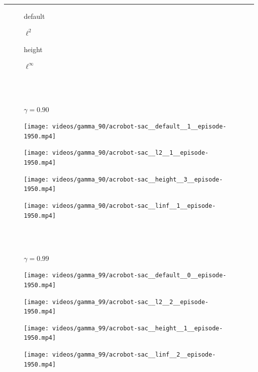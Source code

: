 \documentclass[
  letterpaper,
  DIV=11,
  numbers=noendperiod,
  oneside]{scrartcl}
\begin{document}
\begin{center}\rule{0.5\linewidth}{0.5pt}\end{center}

\begin{figure}

\begin{minipage}{0.20\linewidth}

\end{minipage}%
%
\begin{minipage}{0.20\linewidth}
default\end{minipage}%
%
\begin{minipage}{0.20\linewidth}
\(\ell^2\)\end{minipage}%
%
\begin{minipage}{0.20\linewidth}
height\end{minipage}%
%
\begin{minipage}{0.20\linewidth}
\(\ell^\infty\)\end{minipage}%
\newline
\begin{minipage}{0.20\linewidth}
\\
\strut \\
\(\gamma = 0.90\)\end{minipage}%
%
\begin{minipage}{0.20\linewidth}
\texttt{[image: videos/gamma\_90/acrobot-sac\_\_default\_\_1\_\_episode-1950.mp4]}\end{minipage}%
%
\begin{minipage}{0.20\linewidth}
\texttt{[image: videos/gamma\_90/acrobot-sac\_\_l2\_\_1\_\_episode-1950.mp4]}\end{minipage}%
%
\begin{minipage}{0.20\linewidth}
\texttt{[image: videos/gamma\_90/acrobot-sac\_\_height\_\_3\_\_episode-1950.mp4]}\end{minipage}%
%
\begin{minipage}{0.20\linewidth}
\texttt{[image: videos/gamma\_90/acrobot-sac\_\_linf\_\_1\_\_episode-1950.mp4]}\end{minipage}%
\newline
\begin{minipage}{0.20\linewidth}
\\
\strut \\
\(\gamma = 0.99\)\end{minipage}%
%
\begin{minipage}{0.20\linewidth}
\texttt{[image: videos/gamma\_99/acrobot-sac\_\_default\_\_0\_\_episode-1950.mp4]}\end{minipage}%
%
\begin{minipage}{0.20\linewidth}
\texttt{[image: videos/gamma\_99/acrobot-sac\_\_l2\_\_2\_\_episode-1950.mp4]}\end{minipage}%
%
\begin{minipage}{0.20\linewidth}
\texttt{[image: videos/gamma\_99/acrobot-sac\_\_height\_\_1\_\_episode-1950.mp4]}\end{minipage}%
%
\begin{minipage}{0.20\linewidth}
\texttt{[image: videos/gamma\_99/acrobot-sac\_\_linf\_\_2\_\_episode-1950.mp4]}\end{minipage}%

\end{figure}%
\end{document}
